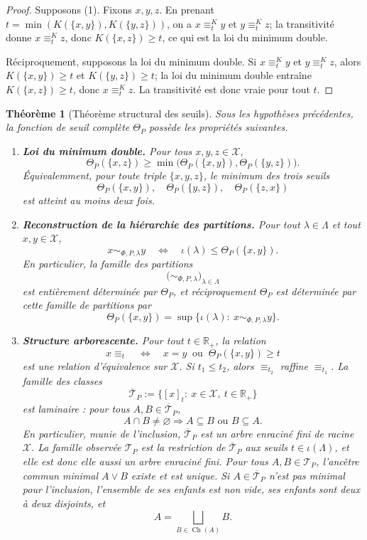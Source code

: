 \documentclass[11pt,a4paper]{article}
\newtheorem{theorem}{Théorème}
\begin{document}
\begin{proof}
Supposons (1). Fixons \(x,y,z\). En prenant \(t=\min(K(\{x,y\}),K(\{y,z\}))\), on a \(x\equiv_t^K y\) et \(y\equiv_t^K z\); la transitivité donne \(x\equiv_t^K z\), donc \(K(\{x,z\})\ge t\), ce qui est la loi du minimum double.

Réciproquement, supposons la loi du minimum double. Si \(x\equiv_t^K y\) et \(y\equiv_t^K z\), alors \(K(\{x,y\})\ge t\) et \(K(\{y,z\})\ge t\); la loi du minimum double entraîne \(K(\{x,z\})\ge t\), donc \(x\equiv_t^K z\). La transitivité est donc vraie pour tout \(t\).
\end{proof}

\begin{theorem}[Théorème structural des seuils]
Sous les hypothèses précédentes, la fonction de seuil complète \(\Theta_P\) possède les propriétés suivantes.
\begin{enumerate}[label=\textbf{(\Alph*)}]
\item \textbf{Loi du minimum double.} Pour tous \(x,y,z\in\mathcal X\),
\[
\Theta_P(\{x,z\})\ge \min\bigl(\Theta_P(\{x,y\}),\Theta_P(\{y,z\})\bigr).
\]
Équivalemment, pour toute triple \(\{x,y,z\}\), le minimum des trois seuils
\[
\Theta_P(\{x,y\}),\quad \Theta_P(\{y,z\}),\quad \Theta_P(\{z,x\})
\]
est atteint au moins deux fois.

\item \textbf{Reconstruction de la hiérarchie des partitions.} Pour tout \(\lambda\in\Lambda\) et tout \(x,y\in\mathcal X\),
\[
x\sim_{\Phi,P,\lambda}y
\quad\Longleftrightarrow\quad
\iota(\lambda)\le \Theta_P(\{x,y\}).
\]
En particulier, la famille des partitions
\[
\bigl(\sim_{\Phi,P,\lambda}\bigr)_{\lambda\in\Lambda}
\]
est entièrement déterminée par \(\Theta_P\), et réciproquement \(\Theta_P\) est déterminée par cette famille de partitions par
\[
\Theta_P(\{x,y\})
=
\sup\{\iota(\lambda):\ x\sim_{\Phi,P,\lambda}y\}.
\]

\item \textbf{Structure arborescente.} Pour tout \(t\in\mathbb R_+\), la relation
\[
x\equiv_t
\quad\Longleftrightarrow\quad
x=y\ \text{ ou }\ \Theta_P(\{x,y\})\ge t
\]
est une relation d'équivalence sur \(\mathcal X\). Si \(t_1\le t_2\), alors \(\equiv_{t_2}\) raffine \(\equiv_{t_1}\). La famille des classes
\[
\overline{\mathcal T}_P:=\{[x]_t:\ x\in\mathcal X,\ t\in\mathbb R_+\}
\]
est laminaire : pour tous \(A,B\in\overline{\mathcal T}_P\),
\[
A\cap B\neq\varnothing \Longrightarrow A\subseteq B \text{ ou } B\subseteq A.
\]
En particulier, munie de l'inclusion, \(\overline{\mathcal T}_P\) est un arbre enraciné fini de racine \(\mathcal X\). La famille observée \(\mathcal T_P\) est la restriction de \(\overline{\mathcal T}_P\) aux seuils \(t\in\iota(\Lambda)\), et elle est donc elle aussi un arbre enraciné fini. Pour tous \(A,B\in\mathcal T_P\), l'ancêtre commun minimal \(A\vee B\) existe et est unique. Si \(A\in\overline{\mathcal T}_P\) n'est pas minimal pour l'inclusion, l'ensemble de ses enfants est non vide, ses enfants sont deux à deux disjoints, et
\[
A=\bigsqcup_{B\in\operatorname{Ch}(A)}B.
\]


\end{enumerate}
\end{theorem}
\end{document}
